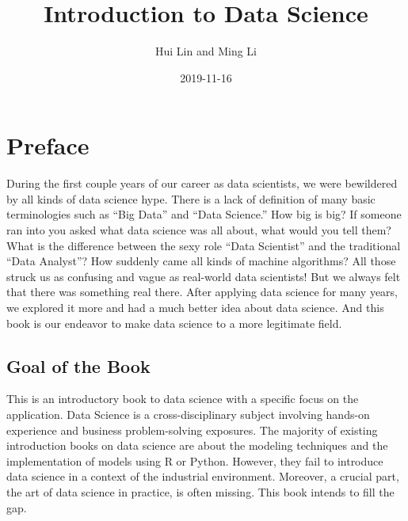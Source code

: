 \documentclass[12pt,]{krantz}
\title{Introduction to Data Science}
\author{Hui Lin and Ming Li}
\date{2019-11-16}
\begin{document}
\maketitle

\thispagestyle{empty}
\begin{center}
\end{center}

\setlength{\abovedisplayskip}{-5pt}
\setlength{\abovedisplayshortskip}{-5pt}

{
\hypersetup{linkcolor=}
\setcounter{tocdepth}{2}
\tableofcontents
}
\listoftables
\listoffigures
\hypertarget{preface}{%
\chapter*{Preface}\label{preface}}


During the first couple years of our career as data scientists, we were bewildered by all kinds of data science hype. There is a lack of definition of many basic terminologies such as ``Big Data'' and ``Data Science.'' How big is big? If someone ran into you asked what data science was all about, what would you tell them? What is the difference between the sexy role ``Data Scientist'' and the traditional ``Data Analyst''? How suddenly came all kinds of machine algorithms? All those struck us as confusing and vague as real-world data scientists! But we always felt that there was something real there. After applying data science for many years, we explored it more and had a much better idea about data science. And this book is our endeavor to make data science to a more legitimate field.

\hypertarget{goal-of-the-book}{%
\section*{Goal of the Book}\label{goal-of-the-book}}


This is an introductory book to data science with a specific focus on the application. Data Science is a cross-disciplinary subject involving hands-on experience and business problem-solving exposures. The majority of existing introduction books on data science are about the modeling techniques and the implementation of models using R or Python. However, they fail to introduce data science in a context of the industrial environment. Moreover, a crucial part, the art of data science in practice, is often missing. This book intends to fill the gap.
\end{document}
